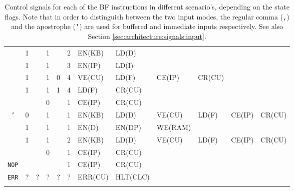 \begin{landscape}
\begin{longtable}[c] {c|cccc|c|llllll}
    \rowcolor{White}              & 1 &   & 1     &      & 2     & EN(KB)   & LD(D)    &         &        &        &        \\
    \rowcolor{White}              & 1 &   & 1     &      & 3     & EN(IP)   & LD(I)    &         &        &        &        \\
    \rowcolor{White}              & 1 &   & 1     & 0    & 4     & VE(CU)   & LD(F)    & CE(IP)  & CR(CU) &        &        \\
    \rowcolor{Gray}               & 1 &   & 1     & 1    & 4     & LD(F)    & CR(CU)   &         &        &        &        \\
    \rowcolor{White}              &   &   & 0     &      & 1     & CE(IP)   & CR(CU)   &         &        &        &        \\ \hline
    \rowcolor{Gray}  \texttt{'}   & 0 &   & 1     &      & 1     & EN(KB)   & LD(D)    & VE(CU)  & LD(F)  & CE(IP) & CR(CU) \\
    \rowcolor{White}              & 1 &   & 1     &      & 1     & EN(D)    & EN(DP)   & WE(RAM) &        &        &        \\
    \rowcolor{White}              & 1 &   & 1     &      & 2     & EN(KB)   & LD(D)    & VE(CU)  & LD(F)  & CE(IP) & CR(CU) \\
    \rowcolor{Gray}               &   &   & 0     &      & 1     & CE(IP)   & CR(CU)   &         &        &        &        \\ \hline
    \rowcolor{White} \texttt{NOP} &   &   &       &      & 1     & CE(IP)   & CR(CU)   &         &        &        &        \\ \hline
    \rowcolor{Gray}  \texttt{ERR} & ? & ? & ?     & ?    & ?     & ERR(CU)  & HLT(CLC) &         &        &        &        \\ \hline

    \caption{Control signals for each of the BF instructions in different scenario's, depending on the state flags. Note that in order to distinguish between the two input modes, the regular comma (\texttt{,}) and the apostrophe (\texttt{'}) are used for buffered and immediate inputs respectively. See also Section \ref{sec:architecture:signals:input}.}
    \label{tab:microcode}
  \end{longtable}
\end{landscape}
